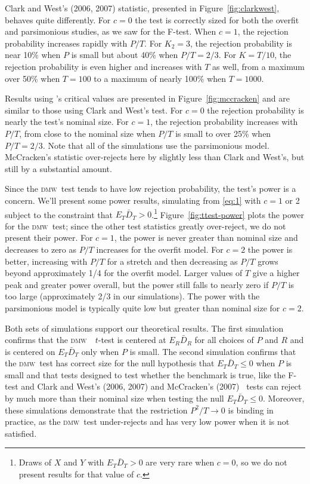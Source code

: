 \documentclass[11pt]{article}
\newcommand{\citepos}[1]{\citeauthor{#1}'s \citeyearpar{#1}}
\newcommand{\oosA}{\bar{D}_{R}}
\newcommand{\oosB}{\bar{D}_{T}}
\newcommand{\dmw}{\textsc{dmw}}
\begin{document}
Clark and West's (2006, 2007) statistic, presented in
Figure~\ref{fig:clarkwest}, behaves quite differently.  For $c=0$ the
test is correctly sized for both the overfit and parsimonious studies,
as we saw for the F-test.  When $c=1$, the rejection probability
increases rapidly with $P/T$.  For $K_2=3$, the rejection probability
is near 10\% when $P$ is small but about 40\% when $P/T = 2/3$.  For
$K=T/10$, the rejection probability is even higher and increases with
$T$ as well, from a maximum over 50\% when $T=100$ to a maximum of
nearly 100\% when $T=1000$.

Results using \citepos{Mcc:07} critical values are
presented in Figure~\ref{fig:mccracken} and are similar to those using
Clark and West's test.  For $c=0$ the rejection probability is nearly
the test's nominal size.  For $c=1$, the rejection probability
increases with $P/T$, from close to the nominal size when $P/T$ is
small to over 25\% when $P/T = 2/3$.  Note that all of the simulations
use the parsimonious model.  McCracken's statistic over-rejects here
by slightly less than Clark and West's, but still by a substantial
amount.

Since the \dmw\ test tends to have low rejection probability, the
test's power is a concern.  We'll present some power results,
simulating from \eqref{eq:1} with $c = 1$ or 2 subject to the
constraint that $E_T \oosB > 0$.\footnote{Draws of $X$ and $Y$ with
  $E_T \oosB > 0$ are very rare when $c=0$, so we do not present
  results for that value of $c$.}  Figure~\ref{fig:ttest-power} plots
the power for the \dmw\ test; since the other test statistics greatly
over-reject, we do not present their power.  For $c=1$, the power is
never greater than nominal size and decreases to zero as $P/T$
increases for the overfit model.  For $c=2$ the power is better,
increasing with $P/T$ for a stretch and then decreasing as $P/T$ grows
beyond approximately 1/4 for the overfit model.  Larger values of $T$
give a higher peak and greater power overall, but the power still
falls to nearly zero if $P/T$ is too large (approximately 2/3 in our
simulations).  The power with the parsimonious model is typically
quite low but greater than nominal size for $c = 2$.

Both sets of simulations support our theoretical results.  The first
simulation confirms that the \dmw\ \oos\ $t$-test is centered at $E_R
\oosA$ for all choices of $P$ and $R$ and is centered on $E_T \oosB$
only when $P$ is small.  The second simulation confirms that the \dmw\
test has correct size for the null hypothesis that $E_T \oosB \leq 0$
when $P$ is small and that tests designed to test whether the
benchmark is true, like the F-test and Clark and West's (2006, 2007)
and McCracken's (2007) \oos\ tests can reject by much more than their
nominal size when testing the null $E_T \oosB \leq 0$.  Moreover,
these simulations demonstrate that the restriction $P^2/T \to 0$ is
binding in practice, as the \dmw\ test under-rejects and has very low
power when it is not satisfied.
\end{document}
